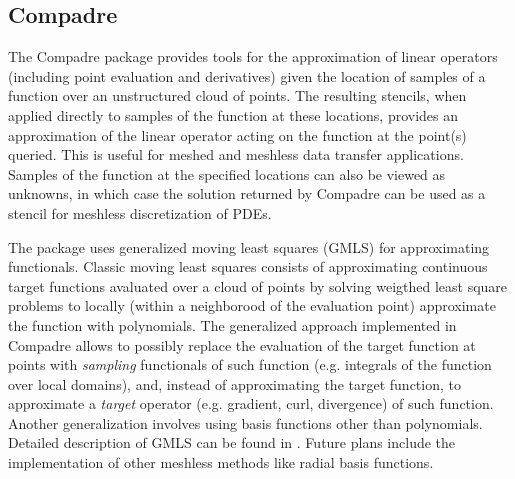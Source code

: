 \subsection{Compadre}
The Compadre package provides tools for the approximation of linear operators (including point evaluation and derivatives) given the location of samples of a function over an unstructured cloud of points. The resulting stencils, when applied directly to samples of the function at these locations, provides an approximation of the linear operator acting on the function at the point(s) queried. This is useful for meshed and meshless data transfer applications. Samples of the function at the specified locations can also be viewed as unknowns, in which case the solution returned by Compadre can be used as a stencil for meshless discretization of PDEs. 

The package uses generalized moving least squares (GMLS) for approximating functionals.
Classic moving least squares consists of approximating continuous target functions avaluated over a cloud of points by solving weigthed least square problems to locally (within a neighborood of the evaluation point) approximate the function with polynomials. The generalized approach implemented in Compadre allows to possibly replace the evaluation of the target function at points with \emph{sampling} functionals of such function (e.g. integrals of the function over local domains), and, instead of approximating the target function, to approximate a \emph{target} operator (e.g. gradient, curl, divergence) of such function. Another generalization involves using basis functions other than polynomials. Detailed description of GMLS can be found in \cite{mirzaei2012generalized,wendland2004scattered}. Future plans include the implementation of other meshless methods like radial basis functions. 


